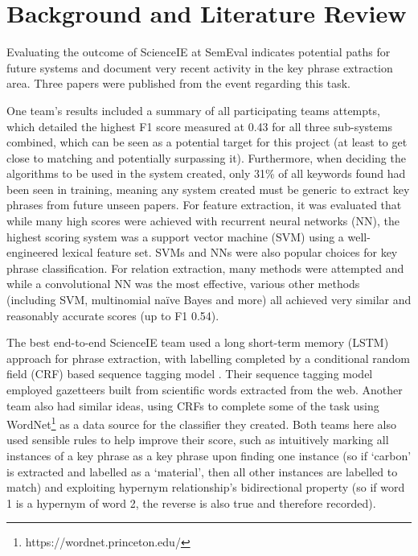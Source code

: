 \section{Background and Literature Review}

Evaluating the outcome of ScienceIE at SemEval indicates potential paths for future systems and document very recent activity in the key phrase extraction area. Three papers were published from the event regarding this task.

One team’s results \cite{Marsi2017} included a summary of all participating teams attempts, which detailed the highest F1 score measured at 0.43 for all three sub-systems combined, which can be seen as a potential target for this project (at least to get close to matching and potentially surpassing it). Furthermore, when deciding the algorithms to be used in the system created, only 31\% of all keywords found had been seen in training, meaning any system created must be generic to extract key phrases from future unseen papers. For feature extraction, it was evaluated that while many high scores were achieved with recurrent neural networks (NN), the highest scoring system was a support vector machine (SVM) using a well-engineered lexical feature set. SVMs and NNs were also popular choices for key phrase classification. For relation extraction, many methods were attempted and while a convolutional NN was the most effective, various other methods (including SVM, multinomial naïve Bayes and more) all achieved very similar and reasonably accurate scores (up to F1 0.54).

The best end-to-end ScienceIE team used a long short-term memory (LSTM) approach for phrase extraction, with labelling completed by a conditional random field (CRF) based sequence tagging model \cite{Ammar2017}. Their sequence tagging model employed gazetteers built from scientific words extracted from the web. Another team \cite{Marsi2017} also had similar ideas, using CRFs to complete some of the task using WordNet\footnote{https://wordnet.princeton.edu/} as a data source for the classifier they created. Both teams here also used sensible rules to help improve their score, such as intuitively marking all instances of a key phrase as a key phrase upon finding one instance (so if ‘carbon’ is extracted and labelled as a ‘material’, then all other instances are labelled to match) and exploiting hypernym relationship’s bidirectional property (so if word 1 is a hypernym of word 2, the reverse is also true and therefore recorded). 

